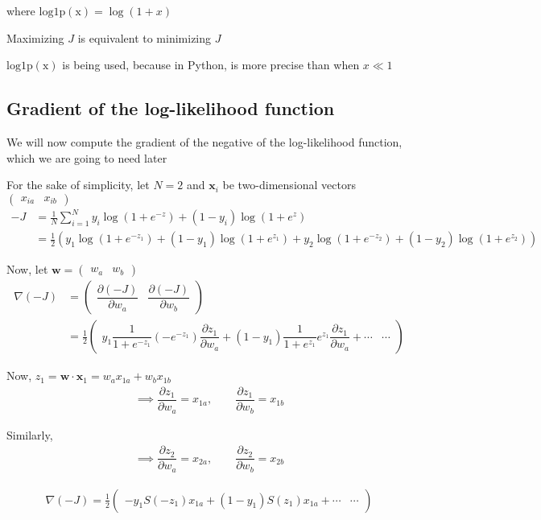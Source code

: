 \documentclass[journal,12pt,onecolumn]{IEEEtran}
\let\vec\mathbf
\providecommand{\brak}[1]{\ensuremath{\left(#1\right)}}
\newcommand{\myvec}[1]{\ensuremath{\begin{pmatrix}#1\end{pmatrix}}}
\begin{document}
	where $\mathrm{log1p(x)} = \log(1+x)$
	
	Maximizing $J$ is equivalent to minimizing $J$
	
	$\mathrm{log1p(x)}$ is being used, because in Python,  is more precise than  when $x \ll 1$
	\pagebreak
	
	\subsection*{Gradient of the log-likelihood function}
	We will now compute the gradient of the negative of the log-likelihood function, which we are going to need later
	
	For the sake of simplicity, let $N = 2$ and $\vec{x}_i$ be two-dimensional vectors \myvec{x_{ia} & x_{ib}}
	\begin{align}
		-J &= \frac{1}{N} \sum_{i=1}^N y_i \log \brak{1 + e^{-z}} + (1 - y_i) \log \brak{1 + e^{z}} \\
		&= \frac{1}{2} \brak{y_1 \log \brak{1 + e^{-z_1}} + (1 - y_1) \log \brak{1 + e^{z_1}} + y_2 \log \brak{1 + e^{-z_2}} + (1 - y_2) \log \brak{1 + e^{z_2}}} 
	\end{align}
	
	Now, let $\vec{w} = \myvec{w_a & w_b}$
	\begin{align}
		\nabla (-J) &= \myvec{\dfrac{\partial (-J)}{\partial w_a} & \dfrac{\partial (-J)}{\partial w_b}} \\
		&= \frac{1}{2} \myvec{y_1  \dfrac{1}{1 + e^{-z_1}} (-e^{-z_1}) \dfrac{\partial z_1}{\partial w_a} + (1 - y_1) \dfrac{1}{1 + e^{z_1}} e^{z_1} \dfrac{\partial z_1}{\partial w_a} + \cdots & \cdots}
	\end{align}
	
	Now, $z_1 = \vec{w} \cdot \vec{x}_1 = w_a x_{1a} + w_b x_{1b}$
	\begin{align}
		\implies \dfrac{\partial z_1}{\partial w_a} = x_{1a}, \qquad \dfrac{\partial z_1}{\partial w_b} = x_{1b} 
	\end{align}
	
	Similarly, 
	\begin{align}
		\implies \dfrac{\partial z_2}{\partial w_a} = x_{2a}, \qquad \dfrac{\partial z_2}{\partial w_b} = x_{2b} 
	\end{align}
	
	\begin{align}
		\nabla (-J) = \frac{1}{2} \myvec{-y_1 S(-z_1) x_{1a} + (1 - y_1) S(z_1) x_{1a} + \cdots & \cdots}
	\end{align}
	
\end{document}
